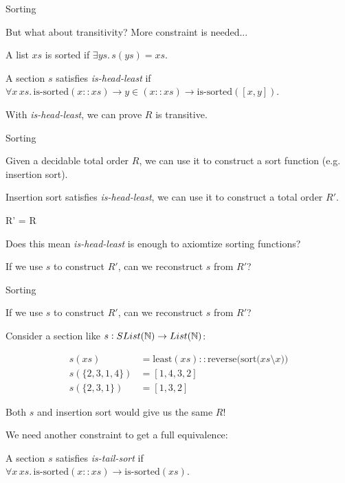 \documentclass[9pt]{beamer}
\begin{document}
\begin{frame}{Sorting}

But what about \alert{transitivity}?
More constraint is needed...

\begin{dblock}
    A list $xs$ is sorted if $\exists ys. \, s(ys) = xs$.
\end{dblock}

\begin{dblock}
    A section $s$ satisfies \textit{is-head-least} if \\
    $\forall x \, xs. \, \text{is-sorted}(x :: xs) \to y \in (x :: xs) \to \text{is-sorted}([x, y])$.
\end{dblock}

With \alert{\textit{is-head-least}}, we can prove $R$ is \alert{transitive}.
   
\end{frame}

\begin{frame}{Sorting}

Given a \alert{decidable total order} $R$, we can use it to construct a sort function (e.g. insertion sort).

Insertion sort satisfies \textit{is-head-least}, we can use it to construct a total order $R'$.

\begin{tblock}
    R' = R
\end{tblock}

Does this mean \textit{is-head-least} is enough to axiomtize sorting functions?

If we use $s$ to construct $R'$, can we reconstruct $s$ from $R'$? 
    
\end{frame}

\begin{frame}{Sorting}

If we use $s$ to construct $R'$, can we reconstruct $s$ from $R'$? 

Consider a section like $s : SList(\mathbb{N}) \to List(\mathbb{N})$:

\begin{align*}
    s(xs) & = \text{least}(xs) :: \text{reverse(sort($xs \setminus x$))} \\
    s(\{2,3,1,4\}) & = [1,4,3,2] \\
    s(\{2,3,1\}) & = [1, 3, 2]
\end{align*}

Both $s$ and insertion sort would give us the same $R$!

We need another constraint to get a \alert{full equivalence}:

\begin{dblock}
    A section $s$ satisfies \textit{is-tail-sort} if \\
    $\forall x \, xs. \, \text{is-sorted}(x :: xs) \to \text{is-sorted}(xs)$.
\end{dblock}
    
\end{frame}
\end{document}
